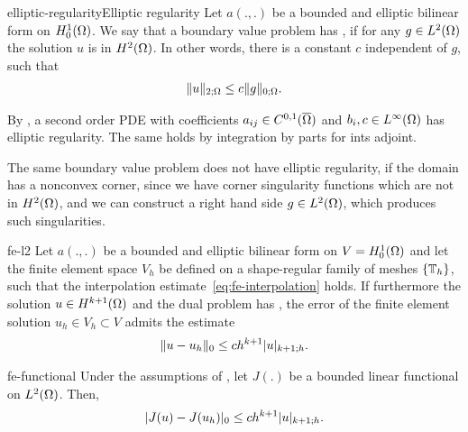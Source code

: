 \begin{Assumption*}{elliptic-regularity}{Elliptic regularity}
  Let $a(.,.)$ be a bounded and elliptic bilinear form on
  $H^1_0(\Omega)$. We say that a boundary value problem has
  , if for any $g\in L^2(\Omega)$ the
  solution $u$ is in $H^2(\Omega)$. In other words, there is a
  constant $c$ independent of $g$, such that
  \begin{gather}
    \lVert u\rVert_{2;\Omega} \le c \lVert g\rVert_{0;\Omega}.
  \end{gather}
\end{Assumption*}

\begin{example}
  By , a second order PDE with
  coefficients $a_{ij}\in C^{0,1}(\overline{\Omega})$ and
  $b_i, c\in L^\infty(\Omega)$ has elliptic regularity. The same
  holds by integration by parts for ints adjoint.

  The same boundary value problem does not have elliptic regularity,
  if the domain has a nonconvex corner, since we have corner
  singularity functions which are not in $H^2(\Omega)$, and we can
  construct a right hand side $g\in L^2(\Omega)$, which produces such
  singularities.
\end{example}

\begin{Theorem}{fe-l2}
  Let $a(.,.)$ be a bounded and elliptic bilinear form on
  $V = H^1_0(\Omega)$ and let the finite element space $V_h$ be
  defined on a shape-regular family of meshes $\{\mathbb T_h\}$, such that
  the interpolation estimate~\eqref{eq:fe-interpolation} holds. If
  furthermore the solution $u\in H^{k+1}(\Omega)$ and the dual
  problem has , the error of the finite
  element solution $u_h\in V_h \subset V$ admits the estimate
  \begin{gather}
    \lVert u-u_h\rVert_{0} \le c h^{k+1} \lvert u\rvert_{k+1;h}.
  \end{gather}
\end{Theorem}

\begin{Corollary}{fe-functional}
  Under the assumptions of , let $J(.)$ be a
  bounded linear functional on $L^2(\Omega)$. Then,
  \begin{gather}
    \lvert J(u)-J(u_h)\rvert_{0} \le c h^{k+1} \lvert u\rvert_{k+1;h}.
  \end{gather}
\end{Corollary}

